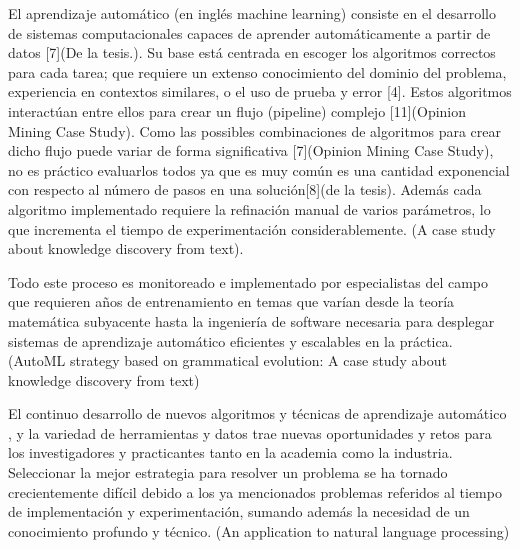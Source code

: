 

El aprendizaje automático (en inglés machine learning) consiste
en el desarrollo de sistemas computacionales capaces de aprender automáticamente a partir de datos [7](De la tesis.). Su base está centrada en escoger los algoritmos correctos para cada tarea; que requiere un extenso conocimiento del dominio del problema, experiencia en contextos similares, o el uso de prueba y error [4]. Estos algoritmos interactúan entre ellos para crear un flujo (pipeline) complejo [11](Opinion Mining Case Study). Como las possibles combinaciones de algoritmos para crear dicho flujo puede variar de forma significativa [7](Opinion Mining Case Study), no es práctico evaluarlos todos ya que es muy común es una cantidad exponencial con respecto al número de pasos en una solución[8](de la tesis). Además cada algoritmo implementado requiere la refinación manual de varios parámetros, lo que incrementa el tiempo de experimentación considerablemente. (A case  study about knowledge discovery from text). \vspace{0.25cm}


Todo este proceso es monitoreado e implementado por especialistas del campo que requieren años de entrenamiento en temas que varían desde la teoría matemática subyacente hasta la ingeniería de software necesaria para desplegar sistemas de aprendizaje automático eficientes y escalables en la práctica. (AutoML strategy based on grammatical evolution: A case study about
knowledge discovery from text) \vspace{0.25cm}


El continuo desarrollo de nuevos algoritmos y técnicas de aprendizaje automático , y la variedad de herramientas y datos trae nuevas oportunidades y retos para los investigadores y practicantes tanto en la academia como la industria. Seleccionar la mejor estrategia para resolver un problema se ha tornado crecientemente difícil debido a los ya mencionados problemas referidos al tiempo de implementación y experimentación, sumando además la necesidad de un conocimiento profundo y técnico. (An application to natural language processing) \vspace{0.25cm}








